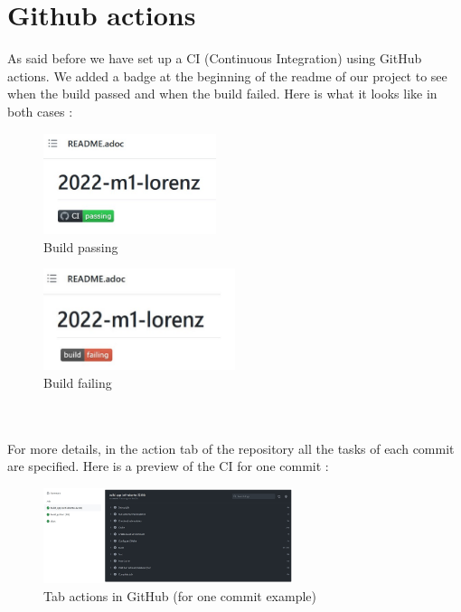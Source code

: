 \newpage

\section{Github actions}
\label{ci}

	As said before we have set up a CI (Continuous Integration) using GitHub actions.
	We added a badge at the beginning of the readme of our project to see when the build passed and when the build failed. Here is what it looks like in both cases : \\
	\begin{minipage}{0.48\linewidth}
		\begin{figure}[H]
			\centering
			\includegraphics[width=0.45\textwidth]{"images/appendix/badge_ok.jpg"}
			\caption{Build passing}
			\label{badge_ok}
		\end{figure}
	\end{minipage}
	\begin{minipage}{0.48\linewidth}
		\begin{figure}[H]
			\centering
			\includegraphics[width=0.5\textwidth]{"images/appendix/badge_not_ok.jpg"}
			\caption{Build failing}
			\label{badge_not_ok}
		\end{figure}
	\end{minipage} \\ \; \\
	For more details, in the action tab of the repository all the tasks of each commit are specified. Here is a preview of the CI for one commit :
	\begin{figure}[H]
		\centering
		\includegraphics[width=0.65\textwidth]{"images/appendix/run_ci.jpg"}
		\caption{Tab actions in GitHub (for one commit example)}
		\label{run_ci}
	\end{figure}
